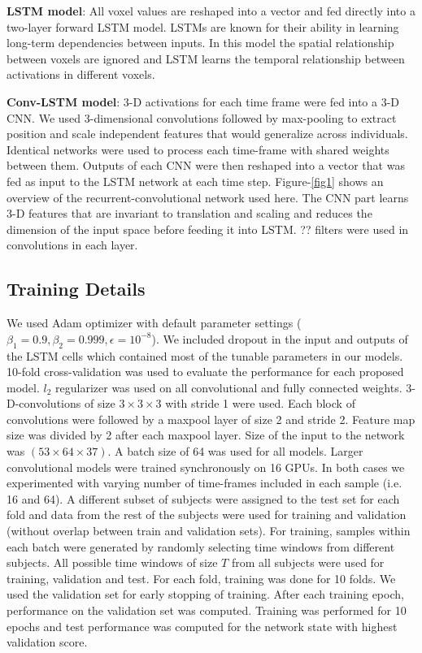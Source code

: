 \documentclass{article}
\begin{document}
\textbf{LSTM model}: All voxel values are reshaped into a vector and fed directly into a two-layer forward LSTM model. LSTMs are known for their ability in learning long-term dependencies between inputs. In this model the spatial relationship between voxels are ignored and LSTM learns the temporal relationship between activations in different voxels. 

\textbf{Conv-LSTM model}: 3-D activations for each time frame were fed into a 3-D CNN. We used 3-dimensional convolutions followed by max-pooling to extract position and scale independent features that would generalize across individuals. Identical networks were used to process each time-frame with shared weights between them. Outputs of each CNN were then reshaped into a vector that was fed as input to the LSTM network at each time step. Figure-\ref{fig1} shows an overview of the recurrent-convolutional network used here. The CNN part learns 3-D features that are invariant to translation and scaling and reduces the dimension of the input space before feeding it into LSTM. ?? filters were used in convolutions in each layer. 

\subsection{Training Details}
\label{training_details}

We used Adam optimizer with default parameter settings ($\beta_1=0.9, \beta_2=0.999, \epsilon=10^{-8}$). We included dropout in the input and outputs of the LSTM cells \citep{Zaremba2014} which contained most of the tunable parameters in our models. 
10-fold cross-validation was used to evaluate the performance for each proposed model. $l_2$ regularizer was used on all convolutional and fully connected weights. 
3-D-convolutions of size $3\times3\times3$ with stride 1 were used. Each block of convolutions were followed by a maxpool layer of size 2 and stride 2. Feature map size was divided by 2 after each maxpool layer. Size of the input to the network was $(53\times64\times37)$. 
A batch size of 64 was used for all models. Larger convolutional models were trained synchronously on 16 GPUs. In both cases we experimented with varying number of time-frames included in each sample (i.e. 16 and 64).
A different subset of subjects were assigned to the test set for each fold and data from the rest of the subjects were used for training and validation (without overlap between train and validation sets). For training, samples within each batch were generated by randomly selecting time windows from different subjects. All possible time windows of size $T$ from all subjects were used for training, validation and test. For each fold, training was done for 10 folds. We used the validation set for early stopping of training. After each training epoch, performance on the validation set was computed. Training was performed for 10 epochs and test performance was computed for the network state with highest validation score. 
\end{document}
